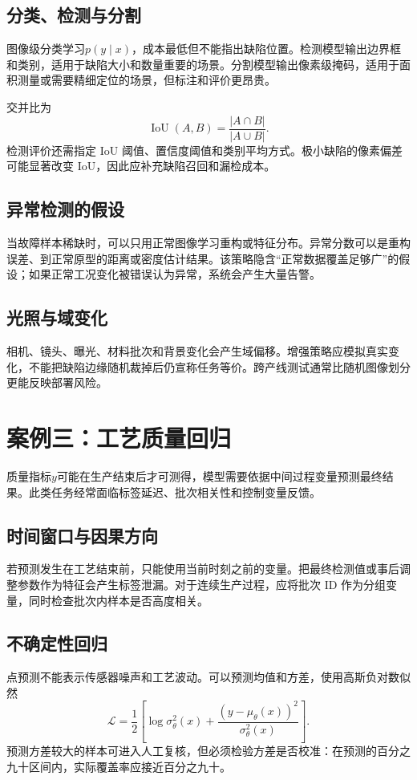 \subsection{分类、检测与分割}
图像级分类学习$p(y\mid x)$，成本最低但不能指出缺陷位置。检测模型输出边界框和类别，适用于缺陷大小和数量重要的场景。分割模型输出像素级掩码，适用于面积测量或需要精细定位的场景，但标注和评价更昂贵。

交并比为
\begin{equation}
 \operatorname{IoU}(A,B)=\frac{|A\cap B|}{|A\cup B|}.
\end{equation}
检测评价还需指定 IoU 阈值、置信度阈值和类别平均方式。极小缺陷的像素偏差可能显著改变 IoU，因此应补充缺陷召回和漏检成本。

\subsection{异常检测的假设}
当故障样本稀缺时，可以只用正常图像学习重构或特征分布。异常分数可以是重构误差、到正常原型的距离或密度估计结果。该策略隐含“正常数据覆盖足够广”的假设；如果正常工况变化被错误认为异常，系统会产生大量告警。

\subsection{光照与域变化}
相机、镜头、曝光、材料批次和背景变化会产生域偏移。增强策略应模拟真实变化，不能把缺陷边缘随机裁掉后仍宣称任务等价。跨产线测试通常比随机图像划分更能反映部署风险。

\section{案例三：工艺质量回归}
质量指标$y$可能在生产结束后才可测得，模型需要依据中间过程变量预测最终结果。此类任务经常面临标签延迟、批次相关性和控制变量反馈。

\subsection{时间窗口与因果方向}
若预测发生在工艺结束前，只能使用当前时刻之前的变量。把最终检测值或事后调整参数作为特征会产生标签泄漏。对于连续生产过程，应将批次 ID 作为分组变量，同时检查批次内样本是否高度相关。

\subsection{不确定性回归}
点预测不能表示传感器噪声和工艺波动。可以预测均值和方差，使用高斯负对数似然
\begin{equation}
 \mathcal{L}=\frac12\left[\log\sigma_\theta^2(x)+\frac{(y-\mu_\theta(x))^2}{\sigma_\theta^2(x)}\right].
\end{equation}
预测方差较大的样本可进入人工复核，但必须检验方差是否校准：在预测的百分之九十区间内，实际覆盖率应接近百分之九十。

